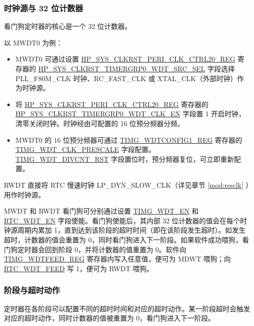 \documentclass[main\_\_CN.tex]{subfiles}
\begin{document}
\subsubsection{时钟源与 32 位计数器}

看门狗定时器的核心是一个 32 位计数器。

以 MWDT0 为例：

\begin{itemize}
    \item MWDT0 可通过设置 \hyperref[regdesc:HPSYSCLKRSTPERICLKCTRL20REG]{HP\_SYS\_CLKRST\_PERI\_CLK\_CTRL20\_REG} 寄存器的 \hyperref[fielddesc:HPSYSCLKRSTTIMERGRP0WDTSRCSEL]{HP\_SYS\_CLKRST\_TIMERGRP0\_WDT\_SRC\_SEL} 字段选择 PLL\_F80M\_CLK 时钟、RC\_FAST\_CLK 或 XTAL\_CLK（外部时钟）作为时钟源。

    \item 将 \hyperref[regdesc:HPSYSCLKRSTPERICLKCTRL20REG]{HP\_SYS\_CLKRST\_PERI\_CLK\_CTRL20\_REG} 寄存器的 \hyperref[fielddesc:HPSYSCLKRSTTIMERGRP0WDTCLKEN]{HP\_SYS\_CLKRST\_TIMERGRP0\_WDT\_CLK\_EN} 字段置 1 开启时钟，清零关闭时钟。时钟经由可配置的 16 位预分频器分频。

    \item MWDT0 的 16 位预分频器可通过 \hyperref[regdesc:TIMGWDTCONFIG1REG]{TIMG\_WDTCONFIG1\_REG} 寄存器的 \hyperref[fielddesc:TIMGWDTCLKPRESCALE]{TIMG\_WDT\_CLK\_PRESCALE} 字段配置。 \hyperref[fielddesc:TIMGWDTDIVCNTRST]{TIMG\_WDT\_DIVCNT\_RST} 字段置位时，预分频器复位，可立即重新配置。
\end{itemize}

RWDT 直接将 RTC 慢速时钟 LP\_DYN\_SLOW\_CLK（详见章节 \ref{mod:resclk} \textit{}）用作时钟源。

MWDT 和 RWDT 看门狗可分别通过设置 \hyperref[fielddesc:TIMGWDTEN]{TIMG\_WDT\_EN} 和 \hyperref[fielddesc:RTCWDTEN]{RTC\_WDT\_EN} 字段使能。看门狗使能后，其内部 32 位计数器的值会在每个时钟源周期内累加 1，直到达到该阶段的超时时间（即在该阶段发生超时）。如发生超时，计数器的值会重置为 0，同时看门狗进入下一阶段。如果软件成功喂狗，看门狗定时器会回到阶段 0，并将计数器的值重置为 0。软件向 \hyperref[regdesc:TIMGWDTFEEDREG]{TIMG\_WDTFEED\_REG} 寄存器内写入任意值，便可为 MDWT  喂狗；向 \hyperref[fielddesc:RTCWDTFEED]{RTC\_WDT\_FEED} 写 1，便可为 RWDT 喂狗。


\subsubsection{阶段与超时动作}\label{sec:wdt-timeout}

定时器在各阶段可以配置不同的超时时间和对应的超时动作。某一阶段超时会触发对应的超时动作，同时计数器的值被重置为 0，看门狗进入下一阶段。
\end{document}
